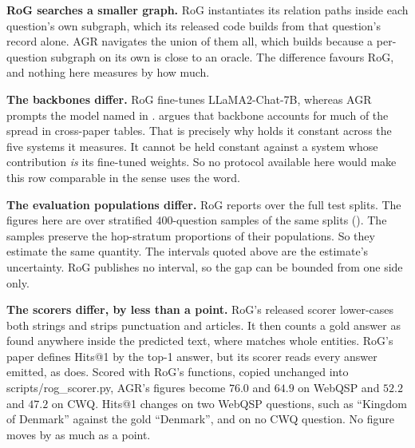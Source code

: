 \textbf{RoG searches a smaller graph.} RoG instantiates its relation paths
inside each question's own subgraph, which its released code builds from that
question's record alone. AGR navigates the union of them all, which
 builds because a per-question subgraph on its own
is close to an oracle. The difference favours RoG, and nothing here measures by
how much.

\textbf{The backbones differ.} RoG fine-tunes LLaMA2-Chat-7B, whereas AGR
prompts the model named in . 
argues that backbone accounts for much of the spread in cross-paper tables. That
is precisely why  holds it constant across the five systems it
measures. It cannot be held constant against a system whose contribution
\emph{is} its fine-tuned weights. So no protocol available here would make this
row comparable in the sense  uses the word.

\textbf{The evaluation populations differ.} RoG reports over the full test
splits. The figures here are over stratified $400$-question samples of the same
splits (). The samples preserve the hop-stratum proportions
of their populations. So they estimate the same quantity. The intervals quoted
above are the estimate's uncertainty. RoG publishes no interval, so the gap can
be bounded from one side only.

\textbf{The scorers differ, by less than a point.} RoG's released scorer
lower-cases both strings and strips punctuation and articles. It then counts a
gold answer as found anywhere inside the predicted text, where
 matches whole entities. RoG's paper defines Hits@1 by the
top-1 answer, but its scorer reads every answer emitted, as 
does. Scored with RoG's functions, copied unchanged into
\textsf{scripts/\allowbreak rog\_scorer.py}, AGR's figures become $76.0$ and
$64.9$ on WebQSP and $52.2$ and $47.2$ on CWQ. Hits@1 changes on two WebQSP
questions, such as ``Kingdom of Denmark'' against the gold ``Denmark'', and on
no CWQ question. No figure moves by as much as a point.


